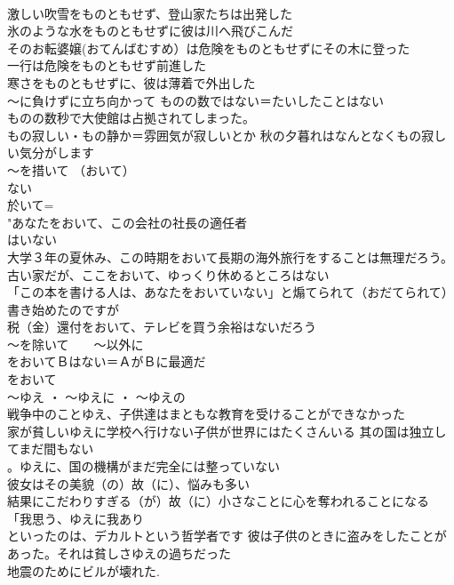 \documentclass[8pt]{extreport}
\begin{document}
\begin{CJK}{UTF8}{min}
\\	激しい吹雪をものともせず、登山家たちは出発した 
\\	氷のような水をものともせずに彼は川へ飛びこんだ 
\\	そのお転婆嬢(おてんばむすめ）は危険をものともせずにその木に登った 
\\	一行は危険をものともせず前進した 
\\	寒さをものともせずに、彼は薄着で外出した 
\\	～に負けずに立ち向かって	ものの数ではない＝たいしたことはない 
\\	ものの数秒で大使館は占拠されてしまった。
\\	もの寂しい・もの静か＝雰囲気が寂しいとか 秋の夕暮れはなんとなくもの寂しい気分がします
\\	～を措いて （おいて） 
\\	ない 
\\	於いて=
\\	"あなたをおいて、この会社の社長の適任者
\\	はいない 
\\	大学３年の夏休み、この時期をおいて長期の海外旅行をすることは無理だろう。 
\\	古い家だが、ここをおいて、ゆっくり休めるところはない 
\\	「この本を書ける人は、あなたをおいていない」と煽てられて（おだてられて）書き始めたのですが 
\\	税（金）還付をおいて、テレビを買う余裕はないだろう 
\\	～を除いて　　～以外に	
\\	をおいてＢはない＝ＡがＢに最適だ 
\\	をおいて
\\	～ゆえ ・ ～ゆえに ・ ～ゆえの	
\\	戦争中のことゆえ、子供達はまともな教育を受けることができなかった 
\\	家が貧しいゆえに学校へ行けない子供が世界にはたくさんいる 其の国は独立してまだ間もない
\\	。ゆえに、国の機構がまだ完全には整っていない
\\	彼女はその美貌（の）故（に）、悩みも多い 
\\	結果にこだわりすぎる（が）故（に）小さなことに心を奪われることになる 
\\	「我思う、ゆえに我あり
\\	といったのは、デカルトという哲学者です 彼は子供のときに盗みをしたことがあった。それは貧しさゆえの過ちだった
\\	地震のためにビルが壊れた. 

\end{CJK}
\end{document}
